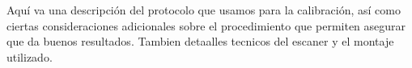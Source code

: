 Aquí va una descripción del protocolo que usamos para la calibración, así como ciertas consideraciones adicionales sobre el procedimiento que permiten  asegurar que da buenos resultados. Tambien detaalles tecnicos del escaner y el montaje utilizado. 
